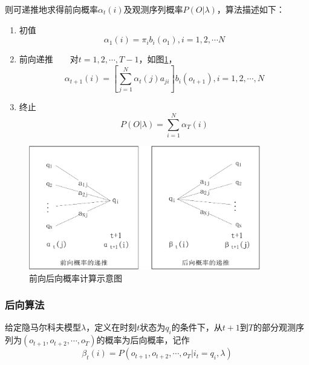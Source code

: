         则可递推地求得前向概率${\alpha _t}(i)$及观测序列概率$P(O|\lambda )$，算法描述如下：
        \begin{enumerate}
            \item 初值
                \begin{equation}
                    {\alpha _1}(i) = {\pi _i}{b_i}({o_1}),i = 1,2, \cdots N
                \end{equation}
            \item 前向递推~~~~对$t = 1,2, \cdots ,T - 1$，如图\ref{fig:forback}，
                \begin{equation}
                    {\alpha _{t + 1}}(i) = \left[ {\sum\limits_{j = 1}^N {{\alpha _t}(j){a_{ji}}} } \right]{b_i}({o_{t + 1}}),i = 1,2, \cdots ,N
                \end{equation}
            \item 终止
                \begin{equation}
                    P(O|\lambda ) = \sum\limits_{i = 1}^N {{\alpha _T}(i)}
                \end{equation}
        \end{enumerate}

        \begin{figure}[htbp]
        \centering
        \includegraphics[width=0.9\textwidth]{figures/chapter2/forback-crop}
        \caption{前向后向概率计算示意图}
        \label{fig:forback}
        \end{figure}

        \subsubsection{后向算法}
        \begin{definition}[后向算法]
        \song 给定隐马尔科夫模型$\lambda$，定义在时刻$t$状态为$q_i$的条件下，从$t+1$到$T$的部分观测序列为$({o_{t+1}},{o_{t+2}},\cdots,{o_T})$的概率为后向概率，记作
             \begin{equation}
                 {\beta _t}(i) = P({o_{t + 1}},{o_{t + 2}}, \cdots ,{o_T}|{i_t} = {q_i},\lambda )
             \end{equation}
        \end{definition}


